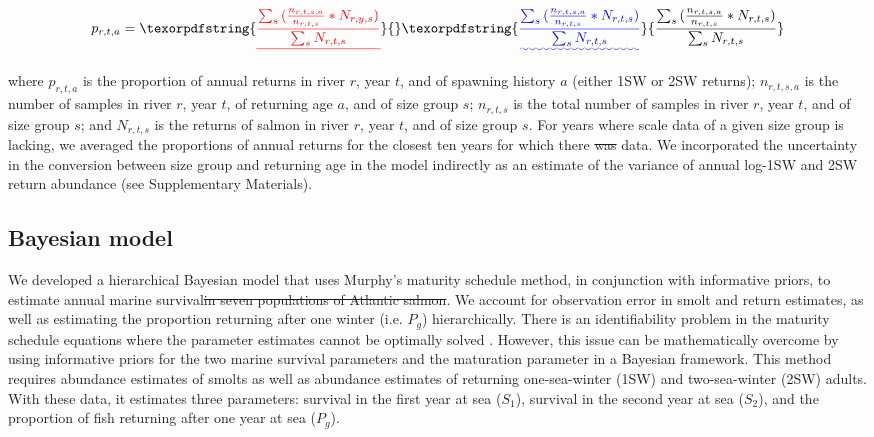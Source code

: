 \documentclass[12pt]{article}
\newcommand{\So}{$S_{1}$\xspace}
\newcommand{\St}{$S_{2}$\xspace}
\newcommand{\Pg}{$P_g$\xspace}
\providecommand{\DIFaddtex}[1]{{\protect\color{blue}\uwave{#1}}} %
\providecommand{\DIFdeltex}[1]{{\protect\color{red}\sout{#1}}}                      %
\providecommand{\DIFaddbegin}{} %
\providecommand{\DIFaddend}{} %
\providecommand{\DIFdelbegin}{} %
\providecommand{\DIFdelend}{} %
\providecommand{\DIFadd}[1]{\texorpdfstring{\DIFaddtex{#1}}{#1}} %
\providecommand{\DIFdel}[1]{\texorpdfstring{\DIFdeltex{#1}}{}} %
\begin{document}
\begin{equation}
    p_{r,t,a} = \DIFdelbegin \DIFdel{\frac{\sum_{s}{(\frac{n_{r,t,s,a}}{n_{r,t,s}} * N_{r,y,s})}}{\sum_{s}{N_{r,t,s}}}
}\DIFdelend \DIFaddbegin \DIFadd{\frac{\sum_{s}{(\frac{n_{r,t,s,a}}{n_{r,t,s}} * N_{r,t,s})}}{\sum_{s}{N_{r,t,s}}}
}\DIFaddend \end{equation}

where $p_{r,t,a}$ is the proportion of annual returns in river $r$, year $t$,
and of spawning history $a$ (either 1SW or 2SW returns); $n_{r,t,s,a}$ is the
number of samples in river $r$, year $t$, of returning age $a$, and of size
group $s$; $n_{r,t,s}$ is the total number of samples in river $r$, year $t$,
and of size group $s$; and $N_{r,t,s}$ is the returns of salmon
in river $r$, year $t$, and of size group $s$.
For years where scale data of a given size group is lacking,
we averaged the proportions of annual returns
for the closest ten years for which there \DIFdelbegin \DIFdel{was }\DIFdelend \DIFaddbegin \DIFadd{were }\DIFaddend data.
We incorporated the uncertainty in the conversion between
size group and returning age in the model indirectly as an estimate
of the variance of annual log-1SW and 2SW return abundance (see Supplementary Materials).

\subsection*{Bayesian model}

We developed a hierarchical Bayesian model that uses Murphy's maturity
schedule method, in conjunction with informative priors, to estimate annual
marine survival\DIFdelbegin \DIFdel{in seven populations of Atlantic salmon}\DIFdelend . We account for
observation error in smolt and return estimates, as well as estimating the
proportion returning after one winter (i.e. \Pg) hierarchically.
There is an identifiability problem in the maturity schedule equations where
the parameter estimates cannot be optimally solved \citep{Chaput2003a}.
However, this issue can be mathematically overcome by
using informative priors for the two marine survival parameters and the maturation
parameter in a Bayesian framework.
This method requires abundance estimates of smolts as well as abundance estimates
of returning one-sea-winter (1SW) and two-sea-winter (2SW) adults. With these data,
it estimates three parameters: survival in the first year at sea (\So), survival
in the second year at sea (\St), and the proportion of fish returning after one
year at sea (\Pg).
\end{document}
